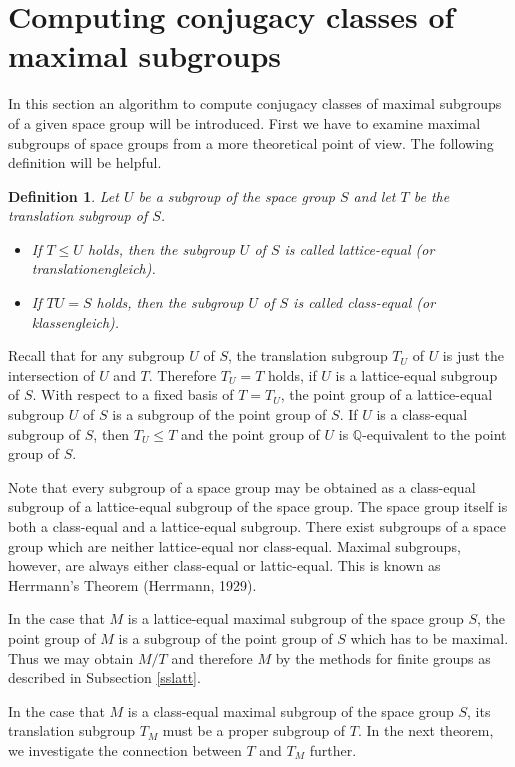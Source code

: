 \documentclass[12pt]{amsart}
\newcommand{\Q}{{\mathbb Q}}
\newtheorem{definition}[theorem]{Definition}
\begin{document}
\section{Computing conjugacy classes of maximal subgroups}
\label{smax}

In this section an algorithm to compute conjugacy classes of maximal
subgroups of a given space group will be introduced. First we have to 
examine maximal subgroups of space groups from a more theoretical
point of view. The following definition will be helpful.

\begin{definition}
Let $U$ be a subgroup of the space group $S$ and let $T$ be the
translation subgroup of $S$.
\begin{itemize}
\item If $T \leq U$ holds, then the subgroup $U$ of $S$ is called 
      {\em lattice-equal} (or {\em translationengleich}).
\item If $T U = S$ holds, then the subgroup $U$ of $S$ is called 
      {\em class-equal} (or {\em klassengleich}).
\end{itemize}
\end{definition}

Recall that for any subgroup $U$ of $S$, the translation subgroup
$T_U$ of $U$ is just the intersection of $U$ and $T$. Therefore
$T_U = T$ holds, if $U$ is a lattice-equal subgroup of $S$. With respect
to a fixed basis of $T = T_U$, the point group of a lattice-equal subgroup
$U$ of $S$ is a subgroup
of the point group of $S$. If $U$ is a class-equal subgroup of $S$,
then $T_U \leq T$ and the point group of $U$ is $\Q$-equivalent to the
point group of $S$. 

Note that every subgroup of a space group may be obtained as a class-equal
subgroup of a lattice-equal subgroup of the space group. The space group
itself is both a class-equal and a lattice-equal subgroup. There
exist subgroups of a space group which are neither lattice-equal nor
class-equal. 
Maximal subgroups, however, are always either class-equal or lattic-equal. 
This is known as Herrmann's Theorem (Herrmann, 1929).

In the case that $M$ is a lattice-equal maximal subgroup of the space
group $S$, the point group of $M$ is a subgroup of the point group of
$S$ which has to be maximal. Thus we may obtain $M / T$ and therefore
$M$ by the methods for finite groups as described in Subsection
\ref{sslatt}.

In the case that $M$ is a class-equal maximal subgroup of the space
group $S$, its translation subgroup $T_M$ must be a proper
subgroup of $T$. In the next theorem, we investigate the connection
between $T$ and $T_M$ further. 
\end{document}
